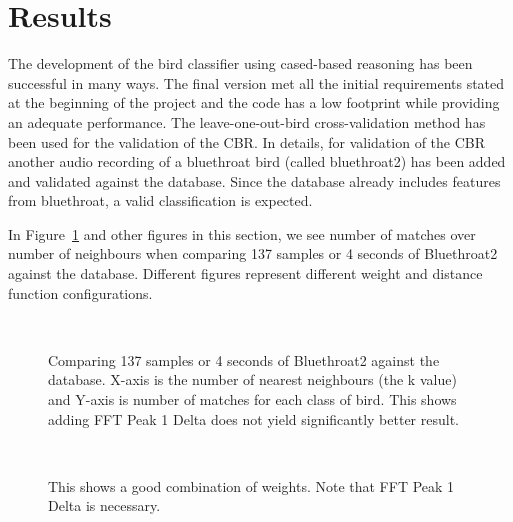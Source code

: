 \section{Results}
The development of the bird classifier using cased-based reasoning has
been successful in many ways. The final version met all the initial requirements
stated at the beginning of the project and the code has a low footprint while
providing an adequate performance. The leave-one-out-bird cross-validation method has been used
for the validation of the CBR. In details, for validation of the CBR another audio recording
of a bluethroat bird (called bluethroat2) has been added and validated against the database.
Since the database already includes features from bluethroat, a valid classification is expected.

In Figure~\ref{fig:results1} and other figures in this section, we see number of matches over number of
neighbours when comparing 137 samples or 4 seconds of Bluethroat2 against the database. Different figures
represent different weight and distance function configurations.


\begin{figure}[htp]
    ~
    \caption{Comparing 137 samples or 4 seconds of Bluethroat2 against the database. X-axis is the number of nearest neighbours (the k value) and Y-axis is number of matches for each class of bird.
    This shows adding FFT Peak 1 Delta does not yield significantly better result.  }
    \label{fig:results1}
\end{figure}

\begin{figure}[htp]

  ~
    \caption{This shows a good combination of weights. Note that FFT Peak 1 Delta is necessary.}
    \label{fig:results2}
\end{figure}



